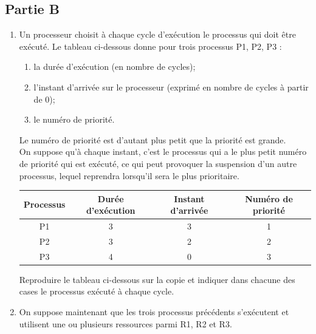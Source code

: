 \documentclass[a4paper,12pt,french]{book}
\begin{document}
\subsection*{Partie B}
\begin{enumerate}[\bfseries 1.]
	\item 	 Un processeur choisit à chaque cycle d’exécution le processus qui doit être exécuté. Le tableau ci-dessous donne pour trois processus P1, P2, P3 :
        \begin{enumerate}[--]
        	\item 	la durée d’exécution (en nombre de cycles);
        	\item 	l’instant d’arrivée sur le processeur (exprimé en nombre de cycles à partir de 0);
            \item 	le numéro de priorité.
        \end{enumerate}
        Le numéro de priorité est d’autant plus petit que la priorité est grande.\\
        On suppose qu’à chaque instant, c’est le processus qui a le plus petit numéro de priorité qui est exécuté, ce qui peut provoquer la suspension d’un autre processus, lequel reprendra lorsqu'il sera le plus prioritaire.
        \begin{center}
        \begin{tabular}{|c|c|c|c|}
        \hline
        \rowcolor{UGLiOrange} \textbf{\color{white}Processus }& \textbf{\color{white}Durée d'exécution} & \textbf{\color{white}Instant d'arrivée} & \textbf{\color{white}Numéro de priorité} \\
        \hline
        P1 & 3 & 3 & 1 \\
        \hline
        P2 & 3 & 2 & 2  \\
        \hline
        P3 & 4 & 0 & 3  \\
        \hline
        \end{tabular}
        \end{center}
        Reproduire le tableau ci-dessous sur la copie et indiquer dans chacune des cases le processus exécuté à chaque cycle.
        \begin{center}
        \end{center}
	\item 	On suppose maintenant que les trois processus précédents s’exécutent et utilisent une ou plusieurs ressources parmi R1, R2 et R3.\\

\end{enumerate}
\end{document}
